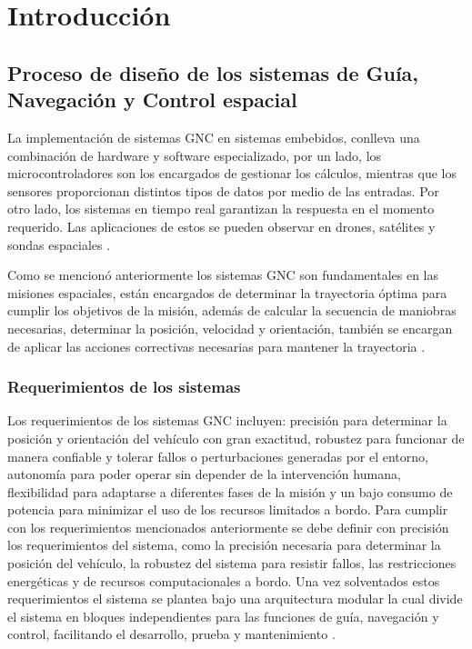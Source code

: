 
\chapter{Introducción}
\label{chp:intro}

\section{Proceso de diseño de los sistemas de Guía, Navegación y Control espacial}

La implementación de sistemas GNC en sistemas embebidos, conlleva una combinación de hardware y software especializado, por un lado, los microcontroladores son los encargados de gestionar los cálculos, mientras que los sensores proporcionan distintos tipos de datos por medio de las entradas. Por otro lado, los sistemas en tiempo real garantizan la respuesta en el momento requerido. Las aplicaciones de estos se pueden observar en drones, satélites y sondas espaciales \cite{MathWorks}.

Como se mencionó anteriormente los sistemas GNC son fundamentales en las misiones espaciales, están encargados de determinar la trayectoria óptima para cumplir los objetivos de la misión, además de calcular la secuencia de maniobras necesarias, determinar la posición, velocidad y orientación, también se encargan de aplicar las acciones correctivas necesarias para mantener la trayectoria \cite{hewing2023enhancing}.


\subsection{Requerimientos de los sistemas}

Los requerimientos de los sistemas GNC incluyen: precisión para determinar la posición y orientación del vehículo con gran exactitud, robustez para funcionar de manera confiable y tolerar fallos o perturbaciones generadas por el entorno, autonomía para poder operar sin depender de la intervención humana, flexibilidad para adaptarse a diferentes fases de la misión y un bajo consumo de potencia para minimizar el uso de los recursos limitados a bordo. 
Para cumplir con los requerimientos mencionados anteriormente se debe definir con precisión los requerimientos del sistema, como la precisión necesaria para determinar la posición del vehículo, la robustez del sistema para resistir fallos, las restricciones energéticas y de recursos computacionales a bordo. Una vez solventados estos requerimientos el sistema se plantea bajo una arquitectura modular la cual divide el sistema en bloques independientes para las funciones de guía, navegación y control, facilitando el desarrollo, prueba y mantenimiento \cite{AEM2017}. 


